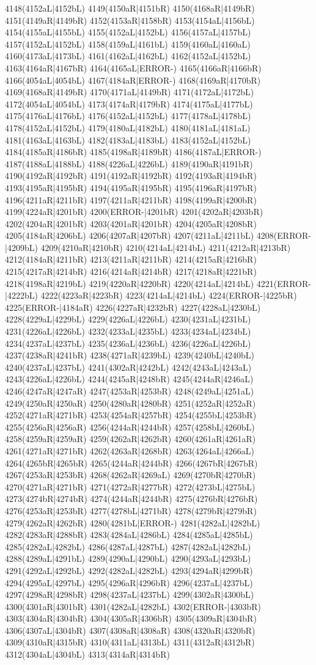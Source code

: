 4148(4152aL|4152bL) 4149(4150aR|4151bR) 4150(4168aR|4149bR) 4151(4149aR|4149bR) 4152(4153aR|4158bR) 4153(4154aL|4156bL) 4154(4155aL|4155bL) 4155(4152aL|4152bL) 4156(4157aL|4157bL) 4157(4152aL|4152bL) 4158(4159aL|4161bL) 4159(4160aL|4160aL) 4160(4173aL|4173bL) 4161(4162aL|4162bL) 4162(4152aL|4152bL) 4163(4164aR|4167bR) 4164(4165aL|ERROR-) 4165(4166aR|4166bR) 4166(4054aL|4054bL) 4167(4184aR|ERROR-) 4168(4169aR|4170bR) 4169(4168aR|4149bR) 4170(4171aL|4149bR) 4171(4172aL|4172bL) 4172(4054aL|4054bL) 4173(4174aR|4179bR) 4174(4175aL|4177bL) 4175(4176aL|4176bL) 4176(4152aL|4152bL) 4177(4178aL|4178bL) 4178(4152aL|4152bL) 4179(4180aL|4182bL) 4180(4181aL|4181aL) 4181(4163aL|4163bL) 4182(4183aL|4183bL) 4183(4152aL|4152bL) 4184(4185aR|4186bR) 4185(4198aR|4189bR) 4186(4187aL|ERROR-) 4187(4188aL|4188bL) 4188(4226aL|4226bL) 4189(4190aR|4191bR) 4190(4192aR|4192bR) 4191(4192aR|4192bR) 4192(4193aR|4194bR) 4193(4195aR|4195bR) 4194(4195aR|4195bR) 4195(4196aR|4197bR) 4196(4211aR|4211bR) 4197(4211aR|4211bR) 4198(4199aR|4200bR) 4199(4224aR|4201bR) 4200(ERROR-|4201bR) 4201(4202aR|4203bR) 4202(4204aR|4201bR) 4203(4201aR|4201bR) 4204(4205aR|4208bR) 4205(4184aR|4206bL) 4206(4207aR|4207bR) 4207(4211aL|4211bL) 4208(ERROR-|4209bL) 4209(4210aR|4210bR) 4210(4214aL|4214bL) 4211(4212aR|4213bR) 4212(4184aR|4211bR) 4213(4211aR|4211bR) 4214(4215aR|4216bR) 4215(4217aR|4214bR) 4216(4214aR|4214bR) 4217(4218aR|4221bR) 4218(4198aR|4219bL) 4219(4220aR|4220bR) 4220(4214aL|4214bL) 4221(ERROR-|4222bL) 4222(4223aR|4223bR) 4223(4214aL|4214bL) 4224(ERROR-|4225bR) 4225(ERROR-|4184aR) 4226(4227aR|4232bR) 4227(4228aL|4230bL) 4228(4229aL|4229bL) 4229(4226aL|4226bL) 4230(4231aL|4231bL) 4231(4226aL|4226bL) 4232(4233aL|4235bL) 4233(4234aL|4234bL) 4234(4237aL|4237bL) 4235(4236aL|4236bL) 4236(4226aL|4226bL) 4237(4238aR|4241bR) 4238(4271aR|4239bL) 4239(4240bL|4240bL) 4240(4237aL|4237bL) 4241(4302aR|4242bL) 4242(4243aL|4243aL) 4243(4226aL|4226bL) 4244(4245aR|4248bR) 4245(4244aR|4246aL) 4246(4247aR|4247aR) 4247(4253aR|4253bR) 4248(4249aL|4251aL) 4249(4250aR|4250aR) 4250(4280aR|4280bR) 4251(4252aR|4252aR) 4252(4271aR|4271bR) 4253(4254aR|4257bR) 4254(4255bL|4253bR) 4255(4256aR|4256aR) 4256(4244aR|4244bR) 4257(4258bL|4260bL) 4258(4259aR|4259aR) 4259(4262aR|4262bR) 4260(4261aR|4261aR) 4261(4271aR|4271bR) 4262(4263aR|4268bR) 4263(4264aL|4266aL) 4264(4265bR|4265bR) 4265(4244aR|4244bR) 4266(4267bR|4267bR) 4267(4253aR|4253bR) 4268(4262aR|4269aL) 4269(4270bR|4270bR) 4270(4271aR|4271bR) 4271(4272aR|4277bR) 4272(4273bL|4275bL) 4273(4274bR|4274bR) 4274(4244aR|4244bR) 4275(4276bR|4276bR) 4276(4253aR|4253bR) 4277(4278bL|4271bR) 4278(4279bR|4279bR) 4279(4262aR|4262bR) 4280(4281bL|ERROR-) 4281(4282aL|4282bL) 4282(4283aR|4288bR) 4283(4284aL|4286bL) 4284(4285aL|4285bL) 4285(4282aL|4282bL) 4286(4287aL|4287bL) 4287(4282aL|4282bL) 4288(4289aL|4291bL) 4289(4290aL|4290bL) 4290(4293aL|4293bL) 4291(4292aL|4292bL) 4292(4282aL|4282bL) 4293(4294aR|4299bR) 4294(4295aL|4297bL) 4295(4296aR|4296bR) 4296(4237aL|4237bL) 4297(4298aR|4298bR) 4298(4237aL|4237bL) 4299(4302aR|4300bL) 4300(4301aR|4301bR) 4301(4282aL|4282bL) 4302(ERROR-|4303bR) 4303(4304aR|4304bR) 4304(4305aR|4306bR) 4305(4309aR|4304bR) 4306(4307aL|4304bR) 4307(4308aR|4308aR) 4308(4320aR|4320bR) 4309(4310aR|4315bR) 4310(4311aL|4313bL) 4311(4312aR|4312bR) 4312(4304aL|4304bL) 4313(4314aR|4314bR) 